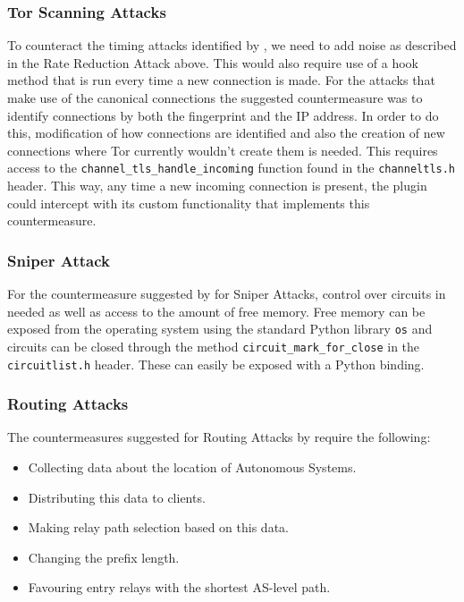 \documentclass[9pt,technote]{IEEEtran}
\begin{document}
\subsubsection{Tor Scanning Attacks}
To counteract the timing attacks identified by \citeauthor{biryukov2012torscan}, we need to add noise as described in the Rate Reduction Attack above. This would also require use of a hook method that is run every time a new connection is made. For the attacks that make use of the canonical connections the suggested countermeasure was to identify connections by both the fingerprint and the IP address. In order to do this, modification of how connections are identified and also the creation of new connections where Tor currently wouldn't create them is needed. This requires access to the \texttt{channel\_tls\_handle\_incoming} function found in the \texttt{channeltls.h} header. This way, any time a new incoming connection is present, the plugin could intercept with its custom functionality that implements this countermeasure. \\

\subsubsection{Sniper Attack}
For the countermeasure suggested by \citeauthor{jansen2014sniper} for Sniper Attacks, control over circuits in needed as well as access to the amount of free memory. Free memory can be exposed from the operating system using the standard Python library \texttt{os} and circuits can
be closed through the method \texttt{circuit\_mark\_for\_close} in the
\texttt{circuitlist.h} header. These can easily be exposed with a Python
binding.\\

\subsubsection{Routing Attacks}
The countermeasures suggested for Routing Attacks by \citeauthor{sun2015raptor} require the following:
\begin{itemize}
\item Collecting data about the location of Autonomous Systems.
\item Distributing this data to clients.
\item Making relay path selection based on this data.
\item Changing the prefix length.
\item Favouring entry relays with the shortest AS-level path.
\end{itemize}
\end{document}
